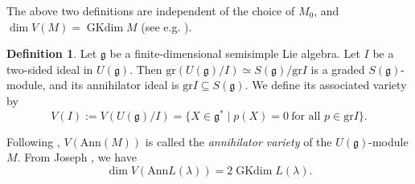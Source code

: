 \documentclass[reqno,12pt]{amsart}
\numberwithin{equation}{section}
\theoremstyle{plain}
\theoremstyle{definition}
\newtheorem{Defff}[Thm]{Definition}
\newcommand{\lam}{\lambda}
\newcommand{\Ann}{\mathrm{Ann}}
\renewcommand{\subset}{\subseteq}
\newcommand{\gkd}{\operatorname{GKdim}}
\begin{document}
The above two definitions are independent of the choice of $M_0$, and $\dim V(M)=\gkd M$ (see e.g. \cite{NOT}). 
	\begin{Defff} Let $\mathfrak{g}$ be a finite-dimensional semisimple Lie algebra. Let $I$ be a two-sided ideal in $U(\mathfrak{g})$. Then $\text{gr}(U(\mathfrak{g})/I)\simeq S(\mathfrak{g})/\text{gr}I$ is a graded $S(\mathfrak{g})$-module, and its annihilator ideal is $\text{gr}I \subset S(\mathfrak{g})$. We define its associated variety by
		$$V(I):=V(U(\mathfrak{g})/I)=\{X\in \mathfrak{g}^* \mid p(X)=0\ \mbox{for all $p\in {\text{gr}}I$}\}.
		$$
	\end{Defff}
	
	Following \cite{GSK}, $V(\Ann (M))$ is called the \textit{annihilator variety} of the $U(\mathfrak{g})$-module $M$. From Joseph \cite[Prop. 2.7]{Jo78}, we have $$\dim V(\Ann L(\lam))=2\gkd L(\lam).$$
	
	
	
	
	
	
	
	
	
	
	
\end{document}
